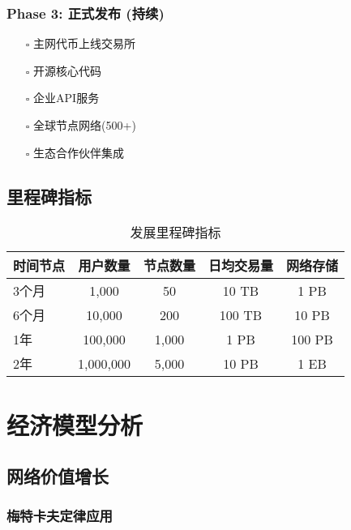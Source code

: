 \documentclass[12pt,a4paper]{article}
\begin{document}
\subsubsection{Phase 3: 正式发布 (持续)}
\begin{itemize}
    \item[$\square$] 主网代币上线交易所
    \item[$\square$] 开源核心代码
    \item[$\square$] 企业API服务
    \item[$\square$] 全球节点网络(500+)
    \item[$\square$] 生态合作伙伴集成
\end{itemize}

\subsection{里程碑指标}

\begin{table}[h]
\centering
\begin{tabular}{|l|c|c|c|c|}
\hline
\textbf{时间节点} & \textbf{用户数量} & \textbf{节点数量} & \textbf{日均交易量} & \textbf{网络存储} \\
\hline
3个月 & 1,000 & 50 & 10 TB & 1 PB \\
\hline
6个月 & 10,000 & 200 & 100 TB & 10 PB \\
\hline
1年 & 100,000 & 1,000 & 1 PB & 100 PB \\
\hline
2年 & 1,000,000 & 5,000 & 10 PB & 1 EB \\
\hline
\end{tabular}
\caption{发展里程碑指标}
\end{table}

\section{经济模型分析}

\subsection{网络价值增长}

\subsubsection{梅特卡夫定律应用}
\end{document}
